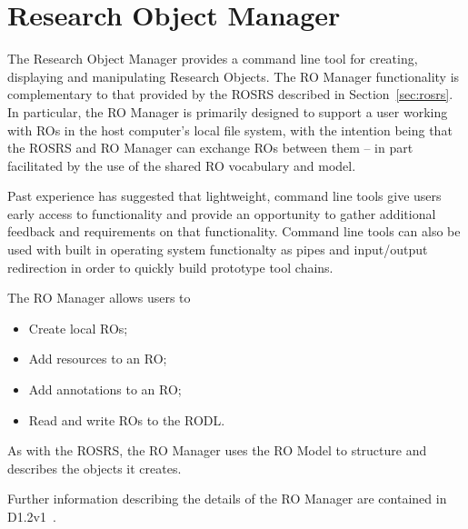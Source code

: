 \section{Research Object Manager}
\label{sec:manager}

The Research Object Manager provides a command line tool for creating, displaying and manipulating Research Objects. The RO Manager functionality is complementary to that provided by the ROSRS described in Section~\ref{sec:rosrs}. In particular, the RO Manager is primarily designed to support a user working with ROs in the host computer's local file system, with the intention being that the ROSRS and RO Manager can exchange ROs between them -- in part facilitated by the use of the shared RO vocabulary and model.

Past experience has suggested that lightweight, command line tools give users early access to functionality and provide an opportunity to gather additional feedback and requirements on that functionality. Command line tools can also be used with built in operating system functionalty as pipes and input/output redirection in order to quickly build prototype tool chains.

The RO Manager allows users to 
\begin{itemize}
\item Create local ROs;
\item Add resources to an RO;
\item Add annotations to an RO;
\item Read and write ROs to the RODL.
\end{itemize}

As with the ROSRS, the RO Manager uses the RO Model to structure and describes the objects it creates.

Further information describing the details of the RO Manager are contained in D1.2v1~\cite{D1.4v1}.
